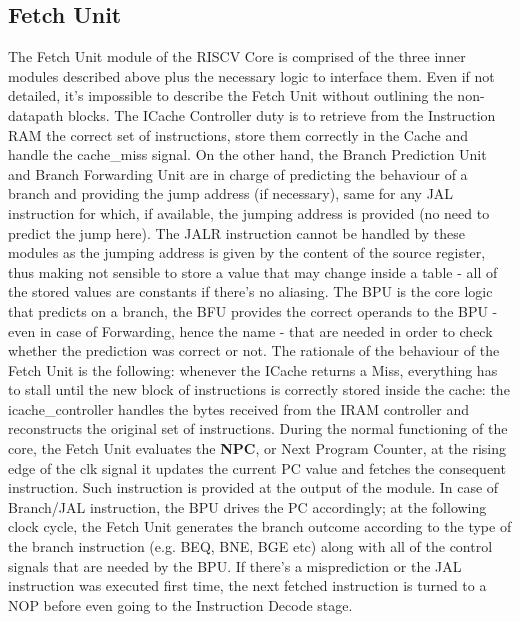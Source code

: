 \documentclass[10pt,  english, makeidx, a4paper, titlepage, oneside]{book}
\begin{document}
\subsection{Fetch Unit}
The Fetch Unit module of the RISCV Core is comprised of the three inner modules described above plus the necessary logic to interface them. Even if not detailed, it's impossible to describe the Fetch Unit without outlining the non-datapath blocks.\newline
The ICache Controller duty is to retrieve from the Instruction RAM the correct set of instructions, store them correctly in the Cache and handle the cache\_miss signal. On the other hand, the Branch Prediction Unit and Branch Forwarding Unit are in charge of predicting the behaviour of a branch and providing the jump address (if necessary), same for any JAL instruction for which, if available, the jumping address is provided (no need to predict the jump here). The JALR instruction cannot be handled by these modules as the jumping address is given by the content of the source register, thus making not sensible to store a value that may change inside a table - all of the stored values are constants if there's no aliasing. The BPU is the core logic that predicts on a branch, the BFU provides the correct operands to the BPU - even in case of Forwarding, hence the name - that are needed in order to check whether the prediction was correct or not. \newline
The rationale of the behaviour of the Fetch Unit is the following: whenever the ICache returns a Miss, everything has to stall until the new block of instructions is correctly stored inside the cache: the icache\_controller handles the bytes received from the IRAM controller and reconstructs the original set of instructions. During the normal functioning of the core, the Fetch Unit evaluates the \textbf{NPC}, or Next Program Counter, at the rising edge of the clk signal it updates the current PC value and fetches the consequent instruction. Such instruction is provided at the output of the module. \newline
In case of Branch/JAL instruction, the BPU drives the PC accordingly; at the following clock cycle, the Fetch Unit generates the branch outcome according to the type of the branch instruction (e.g. BEQ, BNE, BGE etc) along with all of the control signals that are needed by the BPU. If there's a misprediction or the JAL instruction was executed first time, the next fetched instruction is turned to a NOP before even going to the Instruction Decode stage.
\end{document}

